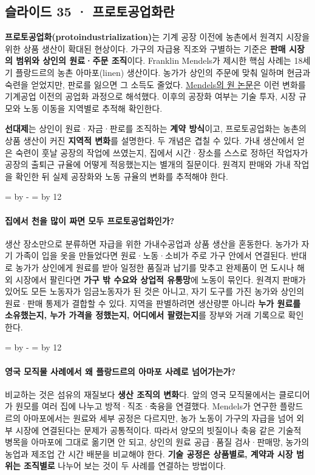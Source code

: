\documentclass[10pt,a4paper]{article}
\newcommand{\ReserveQuestionSpace}{%
  \par\begingroup
  \dimen0=\pagegoal \advance\dimen0 by -\pagetotal
  \dimen2=\baselineskip \multiply\dimen2 by 12
  \ifdim\dimen0<\dimen2 \newpage\fi
  \endgroup}
\begin{document}
\subsection{슬라이드 35 · 프로토공업화란}
\textbf{프로토공업화(protoindustrialization)}는 기계 공장 이전에 농촌에서 원격지 시장을 위한 상품 생산이 확대된 현상이다. 가구의 자급용 직조와 구별하는 기준은 \textbf{판매 시장의 범위와 상인의 원료·주문 조직}이다. Franklin Mendels가 제시한 핵심 사례는 18세기 플랑드르의 농촌 아마포(linen) 생산이다. 농가가 상인의 주문에 맞춰 일하며 현금과 숙련을 얻었지만, 판로를 잃으면 그 소득도 줄었다. \href{https://www.cambridge.org/core/journals/journal-of-economic-history/article/abs/protoindustrialization-the-first-phase-of-the-industrialization-process/041BAB14C81FD40403F9D10A6E85DD86}{Mendels의 원 논문}은 이런 변화를 기계공업 이전의 공업화 과정으로 해석했다. 이후의 공장화 여부는 기술 투자, 시장 규모와 노동 이동을 지역별로 추적해 확인한다.\par

\textbf{선대제}는 상인이 원료·자금·판로를 조직하는 \textbf{계약 방식}이고, 프로토공업화는 농촌의 상품 생산이 커진 \textbf{지역적 변화}를 설명한다. 두 개념은 겹칠 수 있다. 가내 생산에서 얻은 숙련이 훗날 공장의 작업에 쓰였는지, 집에서 시간·장소를 스스로 정하던 작업자가 공장의 출퇴근 규율에 어떻게 적응했는지는 별개의 질문이다. 원격지 판매와 가내 작업을 확인한 뒤 실제 공장화와 노동 규율의 변화를 추적해야 한다.\par

\ReserveQuestionSpace
\paragraph{집에서 천을 많이 짜면 모두 프로토공업화인가?}
생산 장소만으로 분류하면 자급을 위한 가내수공업과 상품 생산을 혼동한다. 농가가 자기 가족이 입을 옷을 만들었다면 원료·노동·소비가 주로 가구 안에서 연결된다. 반대로 농가가 상인에게 원료를 받아 일정한 품질과 납기를 맞추고 완제품이 먼 도시나 해외 시장에서 팔린다면 \textbf{가구 밖 수요와 상업적 유통망}에 노동이 묶인다. 원격지 판매가 있어도 모든 노동자가 임금노동자가 된 것은 아니고, 자기 도구를 가진 농가와 상인의 원료·판매 통제가 결합할 수 있다. 지역을 판별하려면 생산량뿐 아니라 \textbf{누가 원료를 소유했는지, 누가 가격을 정했는지, 어디에서 팔렸는지}를 장부와 거래 기록으로 확인한다.\par

\ReserveQuestionSpace
\paragraph{영국 모직물 사례에서 왜 플랑드르의 아마포 사례로 넘어가는가?}
비교하는 것은 섬유의 재질보다 \textbf{생산 조직의 변화}다. 앞의 영국 모직물에서는 클로디어가 원모를 여러 집에 나누고 방적·직조·축융을 연결했다. Mendels가 연구한 플랑드르의 아마포에서는 원료와 세부 공정은 다르지만, 농가 노동이 가구의 자급을 넘어 외부 시장에 연결된다는 문제가 공통적이다. 따라서 양모의 빗질이나 축융 같은 기술적 병목을 아마포에 그대로 옮기면 안 되고, 상인의 원료 공급·품질 검사·판매망, 농가의 농업과 제조업 간 시간 배분을 비교해야 한다. \textbf{기술 공정은 상품별로, 계약과 시장 범위는 조직별로} 나누어 보는 것이 두 사례를 연결하는 방법이다.\par
\end{document}

